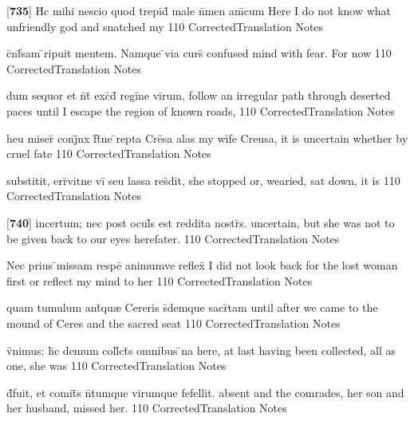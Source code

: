 \latline
  {[\textbf{735}] H\={\macron {\i}}c mihi nescio quod trepid\={} male n\={}men am\={\macron {\i}}cum}
  { Here I do not know what unfriendly god and snatched my  }
  {110}
  { CorrectedTranslation }
  { Notes }


\latline
  {c\={}nf\={}sam \={}ripuit mentem.  Namque \={}via curs\={}}
  { confused mind with fear.  For now  }
  {110}
  { CorrectedTranslation }
  { Notes }


\latline
  {dum sequor et n\={}t\={} exc\={}d\={} regi\={}ne vi\={}rum,}
  { follow an irregular path through deserted paces until I escape the region of known roads, }
  {110}
  { CorrectedTranslation }
  { Notes }


\latline
  {heu miser\={} conj\={}nx f\={}t\={}ne \={}repta Cre\={}sa}
  { alas my wife Creusa, it is uncertain whether by cruel fate  }
  {110}
  { CorrectedTranslation }
  { Notes }


\latline
  {substitit, err\={}vitne vi\={} seu lassa res\={}dit,}
  {she stopped or, wearied, sat down, it is  }
  {110}
  { CorrectedTranslation }
  { Notes }


\latline
  {[\textbf{740}] incertum; nec post ocul\={\macron {\i}}s est reddita nostr\={\macron {\i}}s.}
  { uncertain, but she was not to be given back to our eyes herefater. }
  {110}
  { CorrectedTranslation }
  { Notes }


\latline
  {Nec prius \={}missam respe\={\macron {\i}} animumve reflex\={\macron {\i}}}
  { I did not look back for the lost woman first or reflect my mind to her }
  {110}
  { CorrectedTranslation }
  { Notes }


\latline
  {quam tumulum ant\={\macron {\i}}qu{\ae} Cereris s\={}demque sacr\={}tam}
  { until after we came to the mound of Ceres and the sacred seat }
  {110}
  { CorrectedTranslation }
  { Notes }


\latline
  {v\={}nimus: h\={\macron {\i}}c demum coll\={}ct\={\macron {\i}}s omnibus \={}na}
  { here, at last having been collected, all as one, she was  }
  {110}
  { CorrectedTranslation }
  { Notes }


\latline
  {d\={}fuit, et comit\={}s n\={}tumque virumque fefellit.}
  { absent and the comrades, her son and her husband, missed her. }
  {110}
  { CorrectedTranslation }
  { Notes }


